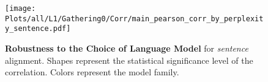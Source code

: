 \begin{figure*}[ht]
    \centering
    \texttt{[image: Plots/all/L1/Gathering0/Corr/main\_pearson\_corr\_by\_perplexity\_sentence.pdf]}
    \caption{\textbf{Robustness to the Choice of Language Model} for \textit{sentence} alignment. Shapes represent the statistical significance level of the correlation. Colors represent the model family.}
    \label{fig:main_pearson_corr_by_perplexity_sentence}
\end{figure*}
    